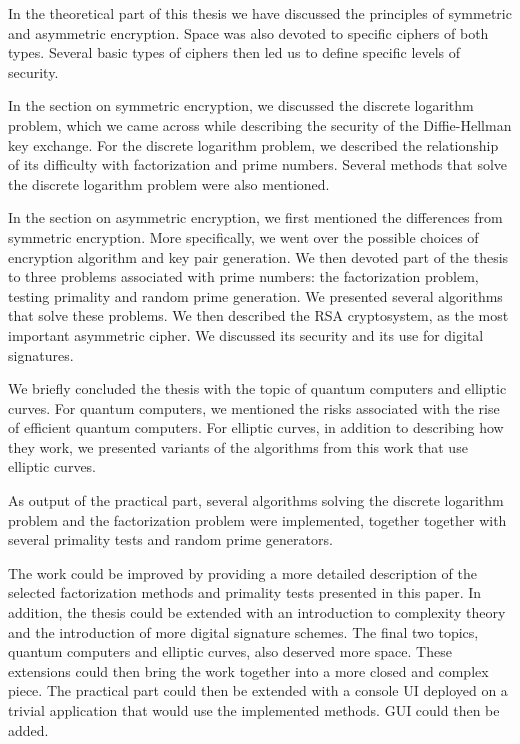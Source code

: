 \documentclass[
  program=infoi,
  biblatex=false,
  figures=true,
  glossaries,
  tables=false,
  sourcecodes=true,
  index
]{kidiplom}
\begin{document}
\begin{kiconclusions}[english]

    In the theoretical part of this thesis we have discussed the principles of symmetric and asymmetric encryption.
    Space was also devoted to specific ciphers of both types.
    Several basic types of ciphers then led us to define specific levels of security.

    In the section on symmetric encryption, we discussed the discrete logarithm problem, which
    we came across while describing the security of the Diffie-Hellman key exchange.
    For the discrete logarithm problem, we described the relationship of its difficulty with factorization and prime numbers.
    Several methods that solve the discrete logarithm problem were also mentioned.

    In the section on asymmetric encryption, we first mentioned the differences from symmetric encryption.
    More specifically, we went over the possible choices of encryption algorithm and key pair generation.
    We then devoted part of the thesis to three problems associated with prime numbers: the factorization problem, testing
    primality and random prime generation.
    We presented several algorithms that solve these problems.
    We then described the RSA cryptosystem, as the most important asymmetric cipher.
    We discussed its security and its use for digital signatures.

    We briefly concluded the thesis with the topic of quantum computers and elliptic curves.
    For quantum computers, we mentioned the risks associated with the rise of efficient quantum computers.
    For elliptic curves, in addition to describing how they work, we presented variants of the algorithms from this work that use
    elliptic curves.

    As output of the practical part, several algorithms solving the discrete logarithm problem and the factorization problem were implemented, together
    together with several primality tests and random prime generators.

    The work could be improved by providing a more detailed description of the selected factorization methods and primality tests presented in this paper.
    In addition, the thesis could be extended with an introduction to complexity theory and the introduction of more digital signature schemes.
    The final two topics, quantum computers and elliptic curves, also deserved more space.
    These extensions could then bring the work together into a more closed and complex piece.
    The practical part could then be extended with a console UI deployed on a trivial application that would use the
    implemented methods. GUI could then be added.

\end{kiconclusions}
\end{document}
